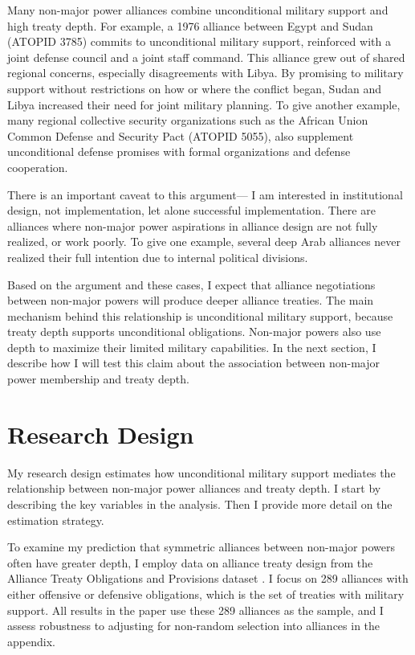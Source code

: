 \documentclass[12pt]{article}
\begin{document}
Many non-major power alliances combine unconditional military support and high treaty depth. 
For example, a 1976 alliance between Egypt and Sudan (ATOPID 3785) commits to unconditional military support, reinforced with a joint defense council and a joint staff command. 
This alliance grew out of shared regional concerns, especially disagreements with Libya. 
By promising to military support without restrictions on how or where the conflict began, Sudan and Libya increased their need for joint military planning. 
To give another example, many regional collective security organizations such as the African Union Common Defense and Security Pact (ATOPID 5055), also supplement unconditional defense promises with formal organizations and defense cooperation.  


There is an important caveat to this argument--- I am interested in institutional design, not implementation, let alone successful implementation. 
There are alliances where non-major power aspirations in alliance design are not fully realized, or work poorly. 
To give one example, several deep Arab alliances never realized their full intention due to internal political divisions.  


Based on the argument and these cases, I expect that alliance negotiations between non-major powers will produce deeper alliance treaties. 
The main mechanism behind this relationship is unconditional military support, because treaty depth supports unconditional obligations. 
Non-major powers also use depth to maximize their limited military capabilities. 
In the next section, I describe how I will test this claim about the association between non-major power membership and treaty depth. 




\section{Research Design}

My research design estimates how unconditional military support mediates the relationship between non-major power alliances and treaty depth. 
I start by describing the key variables in the analysis. 
Then I provide more detail on the estimation strategy. 


To examine my prediction that symmetric alliances between non-major powers often have greater depth, I employ data on alliance treaty design from the Alliance Treaty Obligations and Provisions dataset \citep{Leedsetal2002}. 
I focus on 289 alliances with either offensive or defensive obligations, which is the set of treaties with military support. 
All results in the paper use these 289 alliances as the sample, and I assess robustness to adjusting for non-random selection into alliances in the appendix. 
\end{document}
